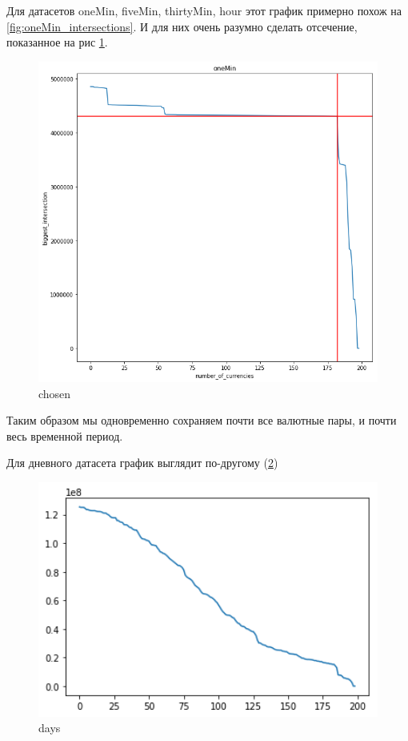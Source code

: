 \documentclass[11pt]{article}
\begin{document}
Для датасетов oneMin, fiveMin, thirtyMin, hour этот график примерно похож на \ref{fig:oneMin_intersections}. И для них очень разумно сделать отсечение, показанное на рис \ref{fig:chosen}. 
\begin{figure}[!htb]
\includegraphics[width = 15cm]{chosen.png}
\caption{chosen}
\label{fig:chosen}
\end{figure} 

Таким образом мы одновременно сохраняем почти все валютные пары, и почти весь временной период.

Для дневного датасета график выглядит по-другому (\ref{fig:days})
\begin{figure}[!htb]
\includegraphics[width = 15cm]{days.png}
\caption{days}
\label{fig:days}
\end{figure} 
\end{document}
